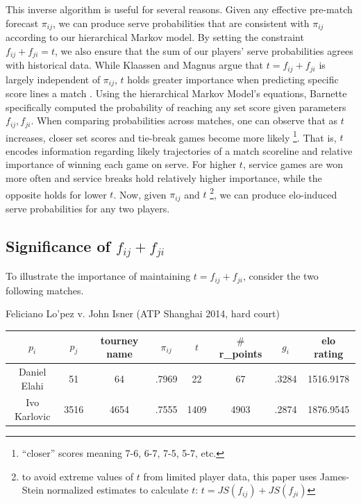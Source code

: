 \documentclass[chapterprefix=false]{report}
\begin{document}
This inverse algorithm is useful for several reasons. Given any effective pre-match forecast $\pi_{ij}$, we can produce serve probabilities that are consistent with $\pi_{ij}$ according to our hierarchical Markov model. By setting the constraint $f_{ij}+f_{ji}=t$, we also ensure that the sum of our players' serve probabilities agrees with historical data. While Klaassen and Magnus argue that $t = f_{ij}+f_{ji}$ is largely independent of $\pi_{ij}$, $t$ holds greater importance when predicting specific score lines a match \cite{Barnett2006}. Using the hierarchical Markov Model's equations, Barnette specifically computed the probability of reaching any set score given parameters $f_{ij},f_{ji}$. When comparing probabilities across matches, one can observe that as $t$ increases, closer set scores and tie-break games become more likely \footnote{``closer'' scores meaning 7-6, 6-7, 7-5, 5-7, etc.}. That is, $t$ encodes information regarding likely trajectories of a match scoreline and relative importance of winning each game on serve. For higher $t$, service games are won more often and service breaks hold relatively higher importance, while the opposite holds for lower $t$. Now, given $\pi_{ij}$ and $t$ \footnote{to avoid extreme values of $t$ from limited player data, this paper uses James-Stein normalized estimates to calculate $t$: $t = JS(f_{ij})+JS(f_{ji})$}, we can produce elo-induced serve probabilities for any two players.





\subsection{Significance of $f_{ij}+f_{ji}$}

To illustrate the importance of maintaining $t=f_{ij}+f_{ji}$, consider the two following matches.

Feliciano Lo'pez v. John Isner (ATP Shanghai 2014, hard court) 

\begin{center}
\begin{tabular}{ |c|c|c|c|c|c|c|c| } 
 \hline
 $p_i$ & $p_j$ & tourney name
 & $\pi_{ij}$ & $t$ & $\#$ r\_points & $g_i$ & elo rating \\ 
 \hline
 Daniel Elahi & 51 & 64 & .7969 & 22 & 67 & .3284 & 1516.9178 
 \\
 \hline
 Ivo Karlovic & 3516 & 4654 & .7555 & 1409 & 4903 & .2874 & 1876.9545 \\ 
 \hline
\end{tabular}
\end{center}
\end{document}
